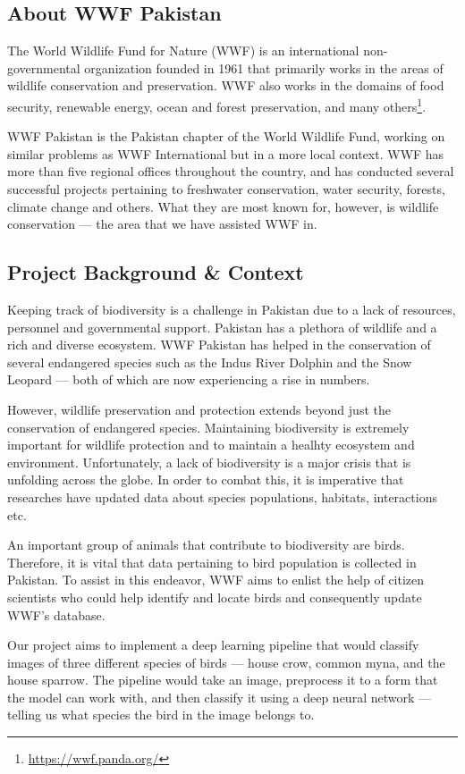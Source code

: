 \documentclass[11pt]{article}
\begin{document}
\subsection{About WWF Pakistan}
The World Wildlife Fund for Nature (WWF) is an international non-governmental organization
founded in 1961 that primarily works in the areas of wildlife conservation and preservation.
WWF also works in the domains of food security, renewable energy, ocean and forest preservation, 
and many others\footnote{\url{https://wwf.panda.org/}}.

WWF Pakistan is the Pakistan chapter of the World Wildlife Fund, working on similar problems as 
WWF International but in a more local context. WWF has more than five regional offices 
throughout the country, and has conducted several successful 
projects pertaining to freshwater conservation, water security, forests, climate change and others.
What they are most known for, however, is wildlife conservation --- the area that we 
have assisted WWF in.

\subsection{Project Background \& Context}
Keeping track of biodiversity is a challenge in Pakistan due to a lack of resources, personnel 
and governmental support. Pakistan has a plethora of wildlife and a rich and diverse ecosystem. 
WWF Pakistan has helped in the conservation of several endangered species such as the 
Indus River Dolphin and the Snow Leopard --- both of which are now experiencing a rise in numbers. 

However, wildlife preservation and protection extends beyond just the conservation of 
endangered species. Maintaining biodiversity is extremely important for 
wildlife protection and to maintain a healhty ecosystem and environment. Unfortunately, 
a lack of biodiversity is a major crisis that is unfolding across the globe. In order to 
combat this, it is imperative that researches have updated data about species populations, 
habitats, interactions etc. 

An important group of animals that contribute to biodiversity are birds. Therefore, 
it is vital that data pertaining to bird population is collected in Pakistan. 
To assist in this endeavor, WWF aims to enlist the help of citizen scientists who could 
help identify and locate birds and consequently update WWF's database. 

Our project aims to implement a deep learning pipeline that would 
classify images of three different species of birds --- house crow, common 
myna, and the house sparrow. The pipeline would take an image, preprocess it 
to a form that the model can work with, and then classify it using a deep 
neural network --- telling us what species the bird in the image belongs to. 
\end{document}
